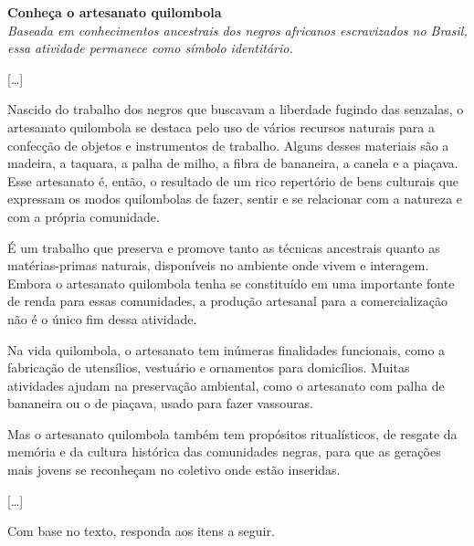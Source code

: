 \begin{myquote}
\textbf{Conheça o artesanato quilombola}\\
\textit{Baseada em conhecimentos ancestrais dos negros africanos escravizados no Brasil, essa atividade permanece como símbolo identitário.}

{[}\ldots{}{]}

Nascido do trabalho dos negros que buscavam a liberdade fugindo das
senzalas, o artesanato quilombola se destaca pelo uso de vários recursos
naturais para a confecção de objetos e instrumentos de trabalho. Alguns
desses materiais são a madeira, a taquara, a palha de milho, a fibra de
bananeira, a canela e a piaçava. Esse artesanato é, então, o resultado
de um rico repertório de bens culturais que expressam os modos
quilombolas de fazer, sentir e se relacionar com a natureza e com a
própria comunidade.

É um trabalho que preserva e promove tanto as técnicas ancestrais quanto
as matérias-primas naturais, disponíveis no ambiente onde vivem e
interagem. Embora o artesanato quilombola tenha se constituído em uma
importante fonte de renda para essas comunidades, a produção artesanal
para a comercialização não é o único fim dessa atividade.

Na vida quilombola, o artesanato tem inúmeras finalidades funcionais,
como a fabricação de utensílios, vestuário e ornamentos para domicílios.
Muitas atividades ajudam na preservação ambiental, como o artesanato com
palha de bananeira ou o de piaçava, usado para fazer vassouras.

Mas o artesanato quilombola também tem propósitos ritualísticos, de
resgate da memória e da cultura histórica das comunidades negras, para
que as gerações mais jovens se reconheçam no coletivo onde estão
inseridas.

{[}\ldots{}{]}

\end{myquote}

Com base no texto, responda aos itens a seguir.

